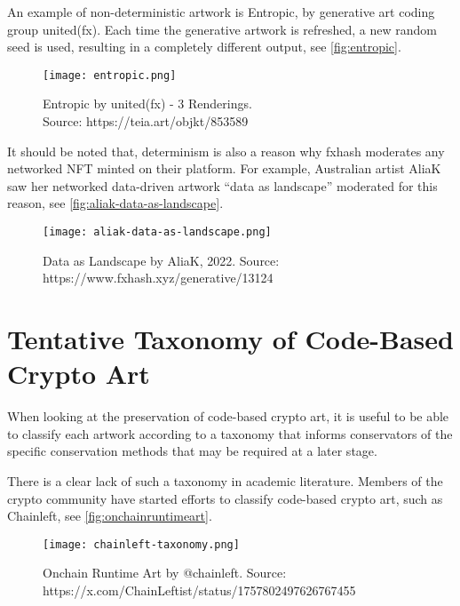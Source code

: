 An example of non-deterministic artwork is Entropic, by generative art coding group united(fx). Each time the generative artwork is refreshed, a new random seed is used, resulting in a completely different output, see \autoref{fig:entropic}.

\begin{figure}[h]
    \centering
    \captionsetup{justification=centering}
    \texttt{[image: entropic.png]}
    \captionsetup{justification=centering}
    \caption[Entropic by united(fx) - 3 Renderings]{Entropic by united(fx) - 3 Renderings. \\ Source: https://teia.art/objkt/853589}
    \label{fig:entropic}
\end{figure}


It should be noted that, determinism is also a reason why fxhash moderates any networked NFT minted on their platform. For example, Australian artist AliaK saw her networked data-driven artwork ``data as landscape'' moderated for this reason, see \autoref{fig:aliak-data-as-landscape}.

\begin{figure}[h]
    \centering
    \captionsetup{justification=centering}
    \texttt{[image: aliak-data-as-landscape.png]}
    \caption[Data as Landscape by AliaK]{Data as Landscape by AliaK, 2022. Source: https://www.fxhash.xyz/generative/13124}
    \label{fig:aliak-data-as-landscape}
\end{figure}



\section{Tentative Taxonomy of Code-Based Crypto Art}
\label{sec:interactivity}

When looking at the preservation of code-based crypto art, it is useful to be able to classify each artwork according to a taxonomy that informs conservators of the specific conservation methods that may be required at a later stage.

There is a clear lack of such a taxonomy in academic literature. Members of the crypto community have started efforts to classify code-based crypto art, such as Chainleft, see \autoref{fig:onchainruntimeart}.

\begin{figure}[h]
    \centering
    \captionsetup{justification=centering}
    \texttt{[image: chainleft-taxonomy.png]}
    \caption[Onchain Runtime Art]{Onchain Runtime Art by @chainleft. Source: https://x.com/ChainLeftist/status/1757802497626767455}
    \label{fig:onchainruntimeart}
\end{figure}

